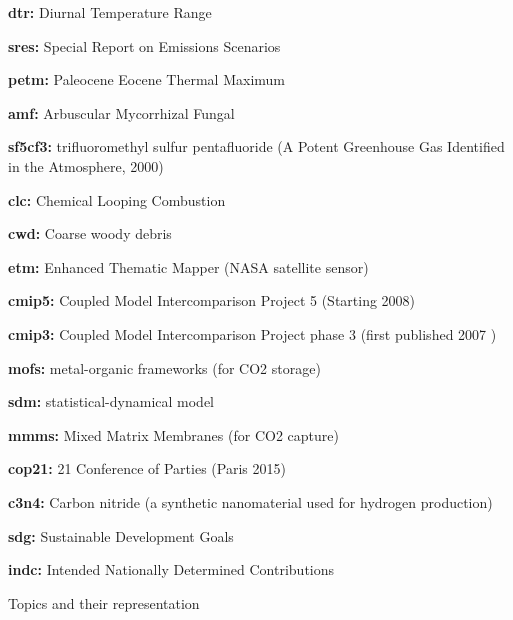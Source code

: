 \documentclass{article}
\begin{document}
\noindent\textbf{dtr:} Diurnal Temperature Range

\noindent\textbf{sres:} Special Report on Emissions Scenarios

\noindent\textbf{petm:} Paleocene Eocene Thermal Maximum

\noindent\textbf{amf:}  Arbuscular Mycorrhizal Fungal

\noindent\textbf{sf5cf3:} trifluoromethyl sulfur pentafluoride (A Potent Greenhouse Gas Identified in the Atmosphere, 2000)

\noindent\textbf{clc:} Chemical Looping Combustion

\noindent\textbf{cwd:} Coarse woody debris

\noindent\textbf{etm:} Enhanced Thematic Mapper (NASA satellite sensor)

\noindent\textbf{cmip5:} Coupled Model Intercomparison Project 5 (Starting 2008)

\noindent\textbf{cmip3:} Coupled Model Intercomparison Project phase 3 (first published 2007 \cite{Meehl2007})

\noindent\textbf{mofs:} metal-organic frameworks (for CO2 storage)

\noindent\textbf{sdm:} statistical-dynamical model

\noindent\textbf{mmms:} Mixed Matrix Membranes (for CO2 capture)

\noindent\textbf{cop21:} 21 Conference of Parties (Paris 2015) 

\noindent\textbf{c3n4:} Carbon nitride (a synthetic nanomaterial used for hydrogen production)

\noindent\textbf{sdg:} Sustainable Development Goals

\noindent\textbf{indc:} Intended Nationally Determined Contributions

\begin{table}[h!]
	\scriptsize
	
	\caption{Topics and their representation}
	\label{top-topics}
\end{table}	

%	

	
\end{document}
